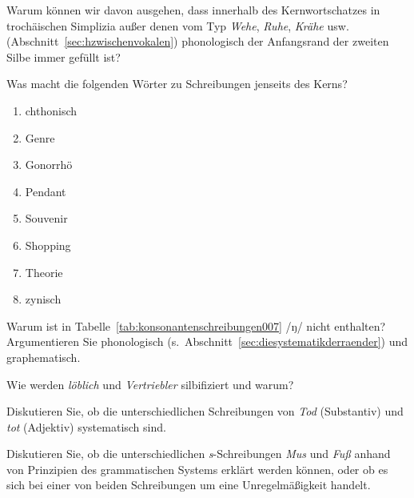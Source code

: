  \label{exc:phonologischeschreibprinzipien05} Warum können wir davon ausgehen, dass innerhalb des Kernwortschatzes in trochäischen Simplizia außer denen vom Typ \textit{Wehe}, \textit{Ruhe}, \textit{Krähe} usw. (Abschnitt~\ref{sec:hzwischenvokalen}) phonologisch der Anfangsrand der zweiten Silbe immer gefüllt ist?

 \label{exc:phonologischeschreibprinzipien06} Was macht die folgenden Wörter zu Schreibungen jenseits des Kerns?

\begin{enumerate}
  \item chthonisch
  \item Genre
  \item Gonorrhö
  \item Pendant
  \item Souvenir
  \item Shopping
  \item Theorie
  \item zynisch
\end{enumerate}

\Uebung[\tristar]{} \label{exc:phonologischeschreibprinzipien07} Warum ist in Tabelle~\ref{tab:konsonantenschreibungen007} /ŋ/ nicht enthalten?
Argumentieren Sie phonologisch (s.\ Abschnitt~\ref{sec:diesystematikderraender}) und graphematisch.

\Uebung[\tristar]{} \label{exc:phonologischeschreibprinzipien08} Wie werden \textit{löblich} und \textit{Vertriebler} silbifiziert und warum?

\Uebung[\tristar]{} \label{exc:phonologischeschreibprinzipien09} Diskutieren Sie, ob die unterschiedlichen Schreibungen von \textit{Tod} (Substantiv) und \textit{tot} (Adjektiv) systematisch sind.

\Uebung[\tristar]{} \label{exc:phonologischeschreibprinzipien10} Diskutieren Sie, ob die unterschiedlichen \textit{s}-Schreibungen \textit{Mus} und \textit{Fuß} anhand von Prinzipien des grammatischen Systems erklärt werden können, oder ob es sich bei einer von beiden Schreibungen um eine Unregelmäßigkeit handelt.
